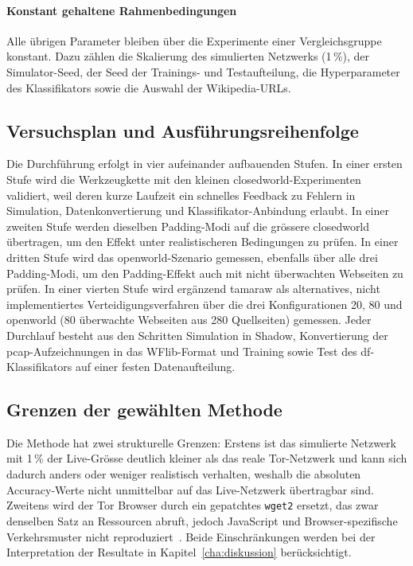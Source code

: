 \paragraph{Konstant gehaltene Rahmenbedingungen}
Alle übrigen Parameter bleiben über die Experimente einer Vergleichsgruppe konstant.
Dazu zählen die Skalierung des simulierten Netzwerks (1\,\%), der Simulator-Seed, der Seed der Trainings- und Testaufteilung, die Hyperparameter des Klassifikators sowie die Auswahl der Wikipedia-URLs.

\subsection{Versuchsplan und Ausführungsreihenfolge}
\label{sec:experiment_plan}

Die Durchführung erfolgt in vier aufeinander aufbauenden Stufen.
In einer ersten Stufe wird die Werkzeugkette mit den kleinen \gls{closedworld}-Experimenten validiert, weil deren kurze Laufzeit ein schnelles Feedback zu Fehlern in Simulation, Datenkonvertierung und Klassifikator-Anbindung erlaubt.
In einer zweiten Stufe werden dieselben Padding-Modi auf die grössere \gls{closedworld} übertragen, um den Effekt unter realistischeren Bedingungen zu prüfen.
In einer dritten Stufe wird das \gls{openworld}-Szenario gemessen, ebenfalls über alle drei Padding-Modi, um den Padding-Effekt auch mit nicht überwachten Webseiten zu prüfen.
In einer vierten Stufe wird ergänzend \gls{tamaraw} als alternatives, nicht implementiertes Verteidigungsverfahren über die drei Konfigurationen 20, 80 und \gls{openworld} (80 überwachte Webseiten aus 280 Quellseiten) gemessen.
Jeder Durchlauf besteht aus den Schritten Simulation in Shadow, Konvertierung der \gls{pcap}-Aufzeichnungen in das WFlib-Format und Training sowie Test des \gls{df}-Klassifikators auf einer festen Datenaufteilung.

\subsection{Grenzen der gewählten Methode}
\label{sec:experiment_grenzen}

Die Methode hat zwei strukturelle Grenzen:
Erstens ist das simulierte Netzwerk mit 1\,\% der Live-Grösse deutlich kleiner als das reale Tor-Netzwerk und kann sich dadurch anders oder weniger realistisch verhalten, weshalb die absoluten Accuracy-Werte nicht unmittelbar auf das Live-Netzwerk übertragbar sind.
Zweitens wird der Tor Browser durch ein gepatchtes \texttt{wget2} ersetzt, das zwar denselben Satz an Ressourcen abruft, jedoch JavaScript und Browser-spezifische Verkehrsmuster nicht reproduziert~\cite{jansen2023data}.
Beide Einschränkungen werden bei der Interpretation der Resultate in Kapitel~\ref{cha:diskussion} berücksichtigt.

